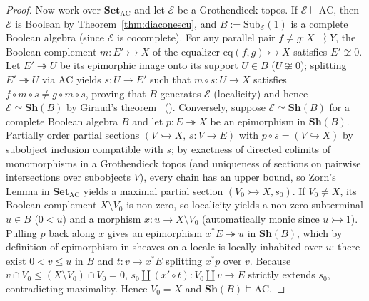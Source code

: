 \begin{proof}
Now work over $\mathbf{Set}_{\mathrm{AC}}$ and let $\mathcal{E}$ be a Grothendieck topos. If $\mathcal{E} \models \mathrm{AC}$, then $\mathcal{E}$ is Boolean by Theorem~\ref{thm:diaconescu}, and $B := \mathrm{Sub}_{\mathcal{E}}(1)$ is a complete Boolean algebra (since $\mathcal{E}$ is cocomplete). For any parallel pair $f \neq g : X \rightrightarrows Y$, the Boolean complement $m : E' \rightarrowtail X$ of the equalizer $\mathrm{eq}(f, g) \rightarrowtail X$ satisfies $E' \not\cong 0$. Let $E' \twoheadrightarrow U$ be its epimorphic image onto its support $U \in B$ ($U \not\cong 0$); splitting $E' \twoheadrightarrow U$ via $\mathrm{AC}$ yields $s : U \to E'$ such that $m \circ s : U \to X$ satisfies $f \circ m \circ s \neq g \circ m \circ s$, proving that $B$ generates $\mathcal{E}$ (localicity) and hence $\mathcal{E} \simeq \mathbf{Sh}(B)$ by Giraud's theorem~\cite[Ch.~IX, \S 5]{MacLaneMoerdijk92} (\cite[\S D4.5]{Johnstone02}). Conversely, suppose $\mathcal{E} \simeq \mathbf{Sh}(B)$ for a complete Boolean algebra $B$ and let $p : E \twoheadrightarrow X$ be an epimorphism in $\mathbf{Sh}(B)$. Partially order partial sections $(V \rightarrowtail X,\, s : V \to E)$ with $p \circ s = (V \hookrightarrow X)$ by subobject inclusion compatible with $s$; by exactness of directed colimits of monomorphisms in a Grothendieck topos (and uniqueness of sections on pairwise intersections over subobjects $V$), every chain has an upper bound, so Zorn's Lemma in $\mathbf{Set}_{\mathrm{AC}}$ yields a maximal partial section $(V_0 \rightarrowtail X, s_0)$. If $V_0 \neq X$, its Boolean complement $X \setminus V_0$ is non-zero, so localicity yields a non-zero subterminal $u \in B$ ($0 < u$) and a morphism $x : u \to X \setminus V_0$ (automatically monic since $u \rightarrowtail 1$). Pulling $p$ back along $x$ gives an epimorphism $x^* E \twoheadrightarrow u$ in $\mathbf{Sh}(B)$, which by definition of epimorphism in sheaves on a locale is locally inhabited over $u$: there exist $0 < v \le u$ in $B$ and $t : v \to x^* E$ splitting $x^* p$ over $v$. Because $v \cap V_0 \le (X \setminus V_0) \cap V_0 = 0$, $s_0 \amalg (x' \circ t) : V_0 \amalg v \to E$ strictly extends $s_0$, contradicting maximality. Hence $V_0 = X$ and $\mathbf{Sh}(B) \models \mathrm{AC}$.
\end{proof}

